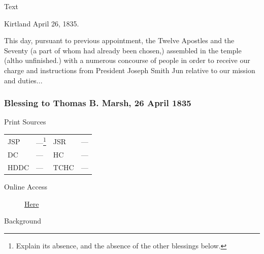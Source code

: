 			\begin{description}
				\item[Text]
			\end{description}
				
				\begin{tightright}
				Kirtland April 26, 1835.
				\end{tightright}
				
				This day, pursuant to previous appointment, the Twelve Apostles and the Seventy (a part of whom had already been chosen,) assembled in the temple (altho unfinished.) with a numerous concourse of people in order to receive our charge and instructions from President Joseph Smith Jun relative to our mission and duties...
				
		\subsubsection{Blessing to Thomas B. Marsh, 26 April 1835}
			\label{EMS-1835-JS-26-APR-1835-TM}
			
			\begin{description}
				\item[Print Sources]
			\end{description}

				\begin{tabular}{p{0.5in}p{1in}p{0.5in}p{1in}}
				JSP	 	& ---\footnote{\label{EMS-1835-JS-26-APR-1835-TM-jsp}	Explain its absence, and the absence of the other blessings below.} & JSR 		& --- \\
				DC	 	& --- 		& HC 		& --- \\
				HDDC 	& ---		& TCHC 		& --- \\
				\end{tabular}
			
			\begin{description}
				\item[Online Access] \href{https://www.josephsmithpapers.org/paper-summary/blessing-to-thomas-b-marsh-26-april-1835/1}{Here}
			\end{description}
			
			\begin{description}
				\item[Background]
			\end{description}
			
